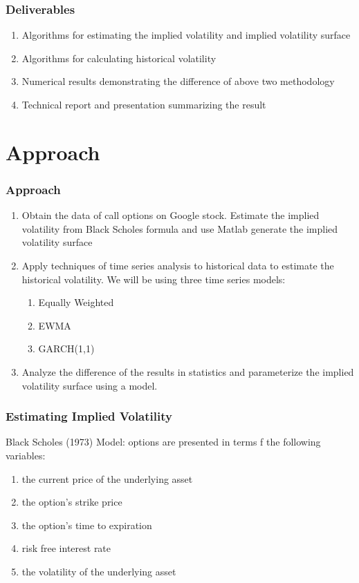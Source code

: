 \documentclass[compress,handout,10pt]{beamer}
\let\olditem\item
\renewcommand{\item}{\setlength{\itemsep}{0.5\baselineskip}\olditem}
\begin{document}
\begin{frame}
    \frametitle{Deliverables}
    \begin{enumerate}
         \item Algorithms for estimating the implied volatility and implied volatility surface
    \item Algorithms for calculating historical volatility
    \item Numerical results demonstrating the difference of above two methodology  
    \item Technical report and presentation summarizing the result
    \end{enumerate}
\end{frame}

\section{Approach}
\begin{frame}
    \frametitle{Approach}
     \begin{enumerate}
         \item Obtain the data of call options on Google stock. Estimate the implied volatility from Black Scholes formula and use Matlab generate the implied volatility surface 
        \item Apply techniques of time series analysis to historical data to estimate the historical volatility. We will be using three time series models: 
\begin{enumerate}
        \item Equally Weighted
        \item EWMA
        \item GARCH(1,1)
     \end{enumerate}
         \item Analyze the difference of the results in statistics and parameterize the implied volatility surface using a model.
     \end{enumerate}
\end{frame}

\begin{frame}
    \frametitle{Estimating Implied Volatility}
Black Scholes (1973) Model: options are presented in terms f the following variables:     
\begin{enumerate}
        \item the current price of the underlying asset
        \item the option's strike price
        \item the option's time to expiration
        \item risk free interest rate
        \item the volatility of the underlying asset
     \end{enumerate}
\end{frame}
\end{document}
